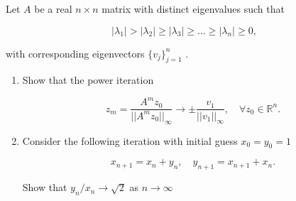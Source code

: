 \begin{exercise}
\label{applied:2023:3}
Let $A$ be a real $n \times n$ matrix with distinct eigenvalues such that

\[
\left| \lambda_ {1} \right| > \left| \lambda_ {2} \right| \geq \left| \lambda_ {3} \right| \geq \dots \geq \left| \lambda_ {n} \right| \geq 0,
\]

with corresponding eigenvectors $\{ v _ { j } \} _ { j = 1 } ^ { n }$ .

\begin{enumerate}[label=(\alph*)]
    \item Show that the power iteration

    \[
    z _ {m} = \frac {A ^ {m} z _ {0}}{| | A ^ {m} z _ {0} | | _ {\infty}} \longrightarrow \pm \frac {v _ {1}}{| | v _ {1} | | _ {\infty}}, \quad \forall z _ {0} \in \mathbb {R} ^ {n}.
    \]

    \item Consider the following iteration with initial guess $x _ { 0 } = y _ { 0 } = 1$

    \[
    x _ {n + 1} = x _ {n} + y _ {n}, \quad y _ {n + 1} = x _ {n + 1} + x _ {n}.
    \]

    Show that $y _ { n } / x _ { n } \to { \sqrt { 2 } }$ as $n \to \infty$
\end{enumerate}
\end{exercise}

